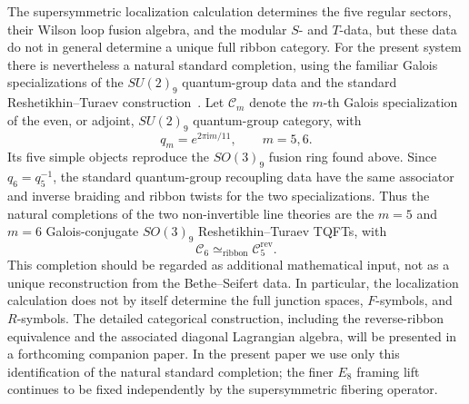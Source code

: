 \documentclass[11pt,a4paper]{article}
\numberwithin{equation}{section}
\begin{document}
The supersymmetric localization calculation determines the five regular sectors, their Wilson loop fusion algebra, and the modular $S$- and $T$-data, but these data do not in general determine a unique full ribbon category.  For the present system there is nevertheless a natural standard completion, using the familiar Galois specializations of the $SU(2)_9$ quantum-group data and the standard Reshetikhin--Turaev construction~\cite{ReshetikhinTuraev:1991,Harvey:2019galois,Ardonne:2010qg}.  Let $\mathcal C_m$ denote the $m$-th Galois specialization of the even, or adjoint, $SU(2)_9$ quantum-group category, with
\begin{equation}
  q_m=e^{2\pi \mathrm{i}m/11},
  \qquad m=5,6.
  \label{eq:standard-ribbon-qm}
\end{equation}
Its five simple objects reproduce the $SO(3)_9$ fusion ring found above.  Since $q_6=q_5^{-1}$, the standard quantum-group recoupling data have the same associator and inverse braiding and ribbon twists for the two specializations.  Thus the natural completions of the two non-invertible line theories are the $m=5$ and $m=6$ Galois-conjugate $SO(3)_9$ Reshetikhin--Turaev TQFTs, with
\begin{equation}
  \mathcal C_6\simeq_{\mathrm{ribbon}}\mathcal C_5^{\mathrm{rev}}.
  \label{eq:standard-ribbon-reverse}
\end{equation}
This completion should be regarded as additional mathematical input, not as a unique reconstruction from the Bethe--Seifert data.  In particular, the localization calculation does not by itself determine the full junction spaces, $F$-symbols, and $R$-symbols.  The detailed categorical construction, including the reverse-ribbon equivalence and the associated diagonal Lagrangian algebra, will be presented in a forthcoming companion paper.  In the present paper we use only this identification of the natural standard completion; the finer $E_8$ framing lift continues to be fixed independently by the supersymmetric fibering operator.
\end{document}
